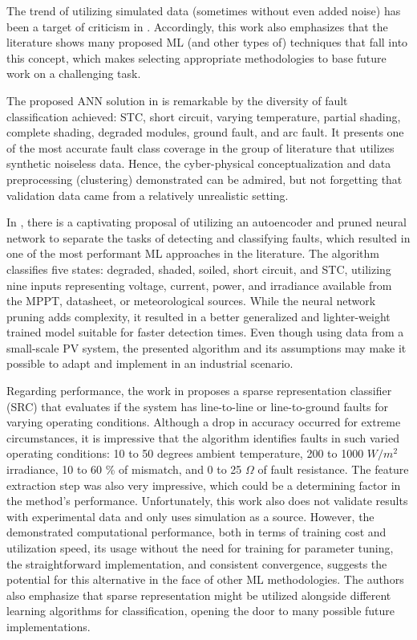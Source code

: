The trend of utilizing simulated data (sometimes without even added noise) has been a target of criticism in \cite{Aziz2020}. Accordingly, this work also emphasizes that the literature shows many proposed ML (and other types of) techniques that fall into this concept, which makes selecting appropriate methodologies to base future work on a challenging task.

The proposed ANN solution in \cite{Rao2019} is remarkable by the diversity of fault classification achieved: STC, short circuit, varying temperature, partial shading, complete shading, degraded modules, ground fault, and arc fault. It presents one of the most accurate fault class coverage in the group of literature that utilizes synthetic noiseless data. Hence, the cyber-physical conceptualization and data preprocessing (clustering) demonstrated can be admired, but not forgetting that validation data came from a relatively unrealistic setting. 

In \cite{Rao2021}, there is a captivating proposal of utilizing an autoencoder and pruned neural network to separate the tasks of detecting and classifying faults, which resulted in one of the most performant ML approaches in the literature. The algorithm classifies five states: degraded, shaded, soiled, short circuit, and STC, utilizing nine inputs representing voltage, current, power, and irradiance available from the MPPT, datasheet, or meteorological sources. While the neural network pruning adds complexity, it resulted in a better generalized and lighter-weight trained model suitable for faster detection times. Even though using data from a small-scale PV system, the presented algorithm and its assumptions may make it possible to adapt and implement in an industrial scenario.

Regarding performance, the work in \cite{Kilic2020} proposes a sparse representation classifier (SRC) that evaluates if the system has line-to-line or line-to-ground faults for varying operating conditions. Although a drop in accuracy occurred for extreme circumstances, it is impressive that the algorithm identifies faults in such varied operating conditions: 10 to 50 degrees ambient temperature, 200 to 1000 $W/m^2$ irradiance, 10 to 60 \% of mismatch, and 0 to 25 $\Omega$ of fault resistance. The feature extraction step was also very impressive, which could be a determining factor in the method's performance. Unfortunately, this work also does not validate results with experimental data and only uses simulation as a source. However, the demonstrated computational performance, both in terms of training cost and utilization speed, its usage without the need for training for parameter tuning, the straightforward implementation, and consistent convergence, suggests the potential for this alternative in the face of other ML methodologies. The authors also emphasize that sparse representation might be utilized alongside different learning algorithms for classification, opening the door to many possible future implementations.

